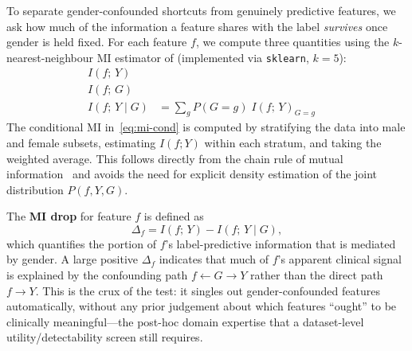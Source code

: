\documentclass[11pt]{article}
\begin{document}
To separate gender-confounded shortcuts from genuinely predictive features, we ask how much of the information a feature shares with the label \emph{survives} once gender is held fixed. For each feature $f$, we compute three quantities using the $k$-nearest-neighbour MI estimator of \citet{kraskov2004estimating} (implemented via \texttt{sklearn}, $k{=}5$):
\begin{align}
    I(f;\, Y)         &\quad \label{eq:mi-label} \\
    I(f;\, G)         &\quad  \label{eq:mi-gender} \\
    I(f;\, Y \mid G)  &= \textstyle\sum_{g} P(G{=}g)\; I(f;\, Y)_{G=g} \quad \label{eq:mi-cond}
\end{align}
The conditional MI in~\eqref{eq:mi-cond} is computed by stratifying the data into male and female subsets, estimating $I(f; Y)$ within each stratum, and taking the weighted average. This follows directly from the chain rule of mutual information~\citep{cover2006elements} and avoids the need for explicit density estimation of the joint distribution $P(f, Y, G)$.

The \textbf{MI drop} for feature $f$ is defined as
\begin{equation}
    \Delta_f = I(f;\, Y) - I(f;\, Y \mid G),
    \label{eq:mi-drop}
\end{equation}
which quantifies the portion of $f$'s label-predictive information that is mediated by gender. A large positive $\Delta_f$ indicates that much of $f$'s apparent clinical signal is explained by the confounding path $f \leftarrow G \rightarrow Y$ rather than the direct path $f \rightarrow Y$. This is the crux of the test: it singles out gender-confounded features automatically, without any prior judgement about which features ``ought'' to be clinically meaningful---the post-hoc domain expertise that a dataset-level utility/detectability screen \citep{drenkow2025gaudit} still requires.
\end{document}
